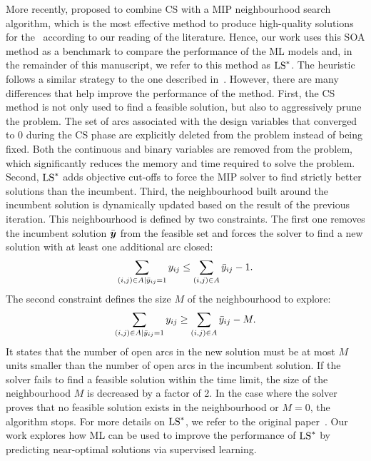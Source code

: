 \documentclass[3p, authoryear, times, doubleblind]{elsarticle}
\begin{document}
{More recently, \cite{katayama_mip_2020} proposed to combine CS with a MIP neighbourhood search algorithm, which is the most effective method to produce high-quality solutions for the \fcn~according to our reading of the literature. Hence, our work uses this SOA method as a benchmark to compare the performance of the ML models and, in the remainder of this manuscript, we refer to this method as $\text{LS}^*$. The heuristic follows a similar strategy to the one described in~\cite{gendron_matheuristics_2018}. However, there are many differences that help improve the performance of the method. First, the CS method is not only used to find a feasible solution, but also to aggressively prune the problem. The set of arcs associated with the design variables that converged to 0 during the CS phase are explicitly deleted from the problem instead of being fixed. Both the continuous and binary variables are removed from the problem, which significantly reduces the memory and time required to solve the problem. Second, $\text{LS}^*$ adds objective cut-offs to force the MIP solver to find strictly better solutions than the incumbent. Third, the neighbourhood built around the incumbent solution is dynamically updated based on the result of the previous iteration. This neighbourhood is defined by two constraints. The first one removes the incumbent solution $\bar{\boldsymbol{y}}$ from the feasible set and forces the solver to find a new solution with at least one additional arc closed: 
\begin{align} \label{eq:kata1}
    \sum_{(i,j) \in A | \bar{y}_{ij} = 1} y_{ij} \leq \sum_{(i,j) \in A} \bar{y}_{ij} - 1.
\end{align}
The second constraint defines the size $M$ of the neighbourhood to explore: 
\begin{align} \label{eq:kata2}
    \sum_{(i,j) \in A | \bar{y}_{ij} = 1} y_{ij} \geq  \sum_{(i,j) \in A} \bar{y}_{ij} - M.
\end{align}
It states that the number of open arcs in the new solution must be at most $M$ units smaller than the number of open arcs in the incumbent solution. If the solver fails to find a feasible solution within the time limit, the size of the neighbourhood $M$ is decreased by a factor of 2. In the case where the solver proves that no feasible solution exists in the neighbourhood or $M=0$, the algorithm stops. For more details on $\text{LS}^*$, we refer to the original paper~\citep{katayama_mip_2020}. Our work explores how ML can be used to improve the performance of $\text{LS}^*$ by predicting near-optimal solutions via supervised learning.

}
\end{document}
